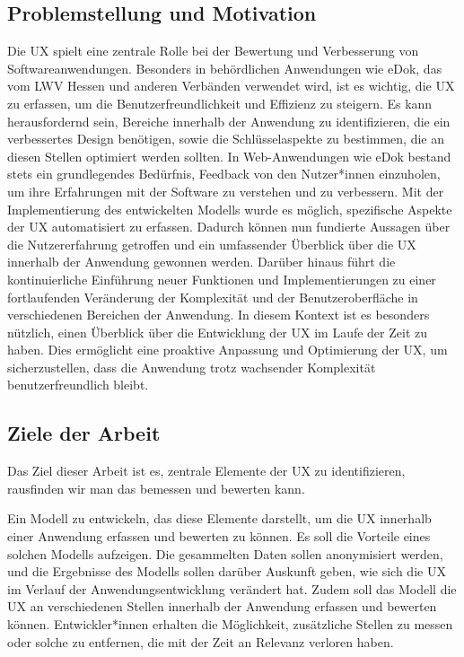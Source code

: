\documentclass[12pt,oneside]{article}
\begin{document}
\subsection{Problemstellung und Motivation}
Die UX spielt eine zentrale Rolle bei der Bewertung und Verbesserung von Softwareanwendungen. Besonders in behördlichen Anwendungen wie eDok, das vom LWV Hessen und anderen Verbänden verwendet wird, ist es wichtig, die UX zu erfassen, um die Benutzerfreundlichkeit und Effizienz zu steigern. Es kann herausfordernd sein, Bereiche innerhalb der Anwendung zu identifizieren, die ein verbessertes Design benötigen, sowie die Schlüsselaspekte zu bestimmen, die an diesen Stellen optimiert werden sollten.
In Web-Anwendungen wie eDok bestand stets ein grundlegendes Bedürfnis, Feedback von den Nutzer*innen einzuholen, um ihre Erfahrungen mit der Software zu verstehen und zu verbessern. Mit der Implementierung des entwickelten Modells wurde es möglich, spezifische Aspekte der UX automatisiert zu erfassen. Dadurch können nun fundierte Aussagen über die Nutzererfahrung getroffen und ein umfassender Überblick über die UX innerhalb der Anwendung gewonnen werden. Darüber hinaus führt die kontinuierliche Einführung neuer Funktionen und Implementierungen zu einer fortlaufenden Veränderung der Komplexität und der Benutzeroberfläche in verschiedenen Bereichen der Anwendung. In diesem Kontext ist es besonders nützlich, einen Überblick über die Entwicklung der UX im Laufe der Zeit zu haben. Dies ermöglicht eine proaktive Anpassung und Optimierung der UX, um sicherzustellen, dass die Anwendung trotz wachsender Komplexität benutzerfreundlich bleibt.




%
\subsection{Ziele der Arbeit}\label{sec:ziele}
Das Ziel dieser Arbeit ist es, zentrale Elemente der UX zu identifizieren, rausfinden wir man das bemessen und bewerten kann. 

Ein Modell zu entwickeln, das diese Elemente darstellt, um die UX innerhalb einer Anwendung erfassen und bewerten zu können. Es soll die Vorteile eines solchen Modells aufzeigen.
Die gesammelten Daten sollen anonymisiert werden, und die Ergebnisse des Modells sollen darüber Auskunft geben, wie sich die UX im Verlauf der Anwendungsentwicklung verändert hat. Zudem soll das Modell die UX an verschiedenen Stellen innerhalb der Anwendung erfassen und bewerten können. Entwickler*innen erhalten die Möglichkeit, zusätzliche Stellen zu messen oder solche zu entfernen, die mit der Zeit an Relevanz verloren haben.
\end{document}
